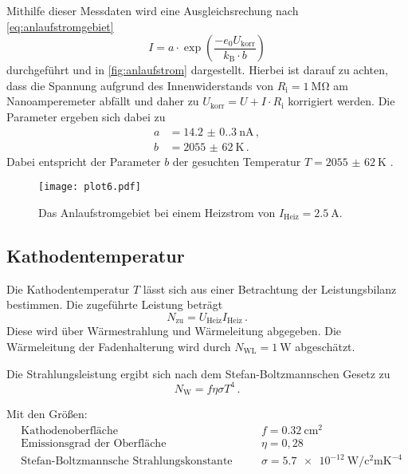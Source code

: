 Mithilfe dieser Messdaten wird eine Ausgleichsrechung nach \autoref{eq:anlaufstromgebiet}
\begin{equation}
  I=a \cdot \exp \left(\frac{-e_{0} U_\text{korr}}{k_{\text{B}} \cdot b}\right)
\end{equation}
durchgeführt und in \autoref{fig:anlaufstrom} dargestellt.
Hierbei ist darauf zu achten, dass die Spannung aufgrund des Innenwiderstands von $R_\text{i} = \qty{1}{\mega\ohm}$
am Nanoamperemeter abfällt und daher zu $U_\text{korr} = U + I \cdot R_\text{i}$ korrigiert werden.
Die Parameter ergeben sich dabei zu
\begin{align*}
  a &= \qty{14.2(0.3)}{\nano\ampere} \, , \\
  b &= \qty{2055(62)}{\kelvin} \, . 
\end{align*}
Dabei entspricht der Parameter $b$ der gesuchten Temperatur $T = \qty{2055(62)}{\kelvin}$ .

\begin{figure}[H]
  \centering
  \texttt{[image: plot6.pdf]}
  \caption{Das Anlaufstromgebiet bei einem Heizstrom von $I_\text{Heiz} = \qty{2,5}{\ampere}$.}
  \label{fig:anlaufstrom}
\end{figure}


\subsection{Kathodentemperatur}

Die Kathodentemperatur $T$ lässt sich aus einer Betrachtung der Leistungsbilanz bestimmen.
Die zugeführte Leistung beträgt
\begin{equation*}
  N_{\text{zu}}=U_{\text{Heiz}} I_{\text{Heiz}} \, .
\end{equation*}
Diese wird über Wärmestrahlung und Wärmeleitung abgegeben. 
Die Wärmeleitung der Fadenhalterung wird durch $N_{\text{WL}} = \qty{1}{\watt}$ abgeschätzt. 

Die Strahlungsleistung ergibt sich nach dem Stefan-Boltzmannschen Gesetz zu
\begin{equation*}
  N_{\mathrm{W}}=f \eta \sigma T^{4} \, .
\end{equation*}

Mit den Größen:
\begin{align*}
  & \text{Kathodenoberfläche} & \quad & f = \qty{0.32}{\centi\meter\squared} \\
  & \text{Emissionsgrad der Oberfläche} & \quad & \eta=0,28 \\
  & \text{Stefan-Boltzmannsche Strahlungskonstante} & \quad & \sigma = \qty{5.7e-12}{\watt\per\square\centi\meter\kelvin\tothe{-4}} 
\end{align*}

